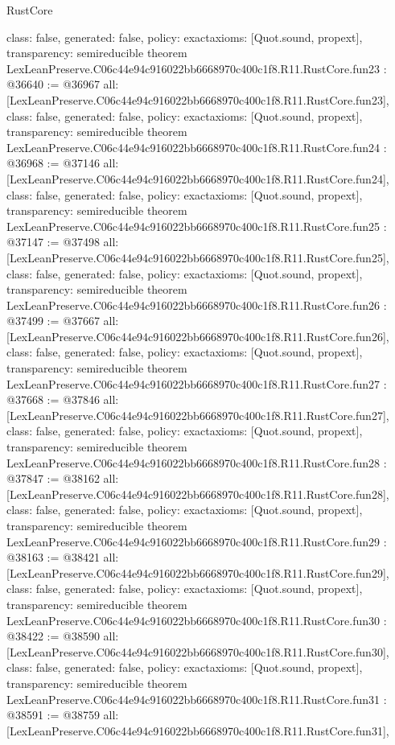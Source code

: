 \begin{lexlean}{RustCore}
\begin{coremodule}
{  class: false,
  generated: false,
  policy: exact{axioms: [Quot.sound, propext]},
  transparency: semireducible
}
theorem LexLeanPreserve.C06c44e94c916022bb6668970c400c1f8.R11.RustCore.fun23 : @36640 := @36967 {
  all: [LexLeanPreserve.C06c44e94c916022bb6668970c400c1f8.R11.RustCore.fun23],
  class: false,
  generated: false,
  policy: exact{axioms: [Quot.sound, propext]},
  transparency: semireducible
}
theorem LexLeanPreserve.C06c44e94c916022bb6668970c400c1f8.R11.RustCore.fun24 : @36968 := @37146 {
  all: [LexLeanPreserve.C06c44e94c916022bb6668970c400c1f8.R11.RustCore.fun24],
  class: false,
  generated: false,
  policy: exact{axioms: [Quot.sound, propext]},
  transparency: semireducible
}
theorem LexLeanPreserve.C06c44e94c916022bb6668970c400c1f8.R11.RustCore.fun25 : @37147 := @37498 {
  all: [LexLeanPreserve.C06c44e94c916022bb6668970c400c1f8.R11.RustCore.fun25],
  class: false,
  generated: false,
  policy: exact{axioms: [Quot.sound, propext]},
  transparency: semireducible
}
theorem LexLeanPreserve.C06c44e94c916022bb6668970c400c1f8.R11.RustCore.fun26 : @37499 := @37667 {
  all: [LexLeanPreserve.C06c44e94c916022bb6668970c400c1f8.R11.RustCore.fun26],
  class: false,
  generated: false,
  policy: exact{axioms: [Quot.sound, propext]},
  transparency: semireducible
}
theorem LexLeanPreserve.C06c44e94c916022bb6668970c400c1f8.R11.RustCore.fun27 : @37668 := @37846 {
  all: [LexLeanPreserve.C06c44e94c916022bb6668970c400c1f8.R11.RustCore.fun27],
  class: false,
  generated: false,
  policy: exact{axioms: [Quot.sound, propext]},
  transparency: semireducible
}
theorem LexLeanPreserve.C06c44e94c916022bb6668970c400c1f8.R11.RustCore.fun28 : @37847 := @38162 {
  all: [LexLeanPreserve.C06c44e94c916022bb6668970c400c1f8.R11.RustCore.fun28],
  class: false,
  generated: false,
  policy: exact{axioms: [Quot.sound, propext]},
  transparency: semireducible
}
theorem LexLeanPreserve.C06c44e94c916022bb6668970c400c1f8.R11.RustCore.fun29 : @38163 := @38421 {
  all: [LexLeanPreserve.C06c44e94c916022bb6668970c400c1f8.R11.RustCore.fun29],
  class: false,
  generated: false,
  policy: exact{axioms: [Quot.sound, propext]},
  transparency: semireducible
}
theorem LexLeanPreserve.C06c44e94c916022bb6668970c400c1f8.R11.RustCore.fun30 : @38422 := @38590 {
  all: [LexLeanPreserve.C06c44e94c916022bb6668970c400c1f8.R11.RustCore.fun30],
  class: false,
  generated: false,
  policy: exact{axioms: [Quot.sound, propext]},
  transparency: semireducible
}
theorem LexLeanPreserve.C06c44e94c916022bb6668970c400c1f8.R11.RustCore.fun31 : @38591 := @38759 {
  all: [LexLeanPreserve.C06c44e94c916022bb6668970c400c1f8.R11.RustCore.fun31],
}
\end{coremodule}
\end{lexlean}
